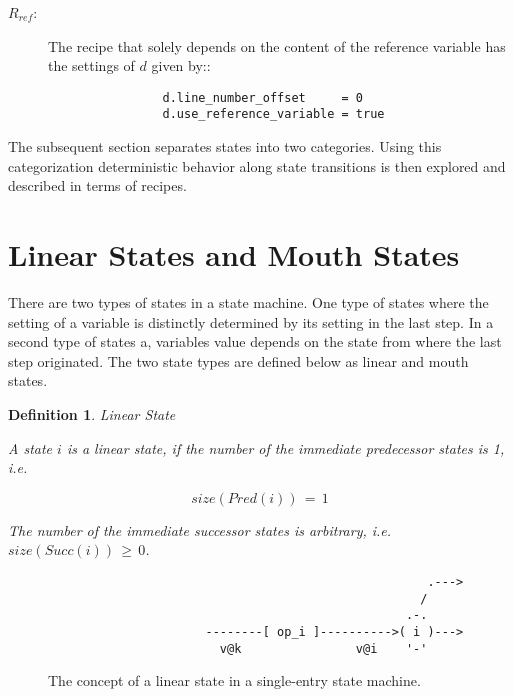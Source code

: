 \documentclass[12pt,a4paper]{scrartcl}
\newtheorem{definition}{Definition}
\begin{document}
\begin{description}
   \item[$R_{ref}$:] The recipe that solely depends on the content of the
       reference variable has the settings of $d$ given by::

        \begin{verbatim}
                d.line_number_offset     = 0
                d.use_reference_variable = true
        \end{verbatim}

\end{description}

The subsequent section separates states into two categories.  Using this
categorization deterministic behavior along state transitions is then explored
and described in terms of recipes.

%
\section{Linear States and Mouth States}

There are two types of states in a state machine. One type of states where the
setting of a variable is distinctly determined by its setting in the last step.
In a second type of states a, variables value depends on the state from where the
last step originated.  The two state types are defined below as linear and
mouth states.

\begin{definition} Linear State

    A state $i$ is a linear state, if the number of the immediate predecessor 
    states is 1, i.e. 

    \begin{equation}
                               size(Pred(i))\,=\,1
    \end{equation}

    The number of the immediate successor states is arbitrary, i.e.
    $size(Succ(i))\,\ge\,0$.

\end{definition}

\begin{figure}[htbp] \leavevmode \label{fig:linear-state}
\begin{verbatim}
                                                     .---> 
                                                    /
                                                  .-.
                      --------[ op_i ]---------->( i )---> 
                        v@k                v@i    '-'

\end{verbatim}
\caption{The concept of a linear state in a single-entry state machine.}
\end{figure}
\end{document}
